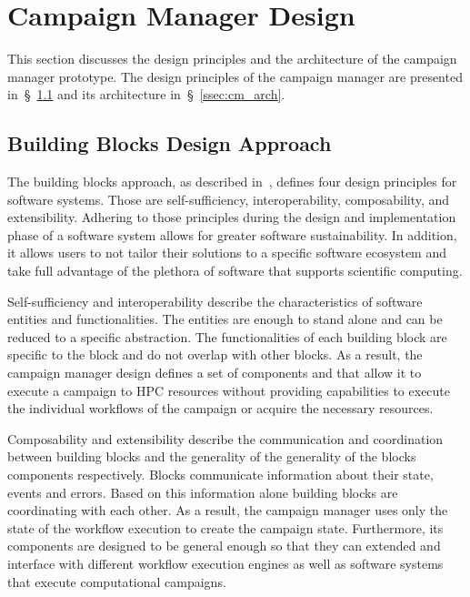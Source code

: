 \section{Campaign Manager Design}
\label{sec:cm_des}

This section discusses the design principles and the architecture of the 
campaign manager prototype. The design principles of the campaign manager are 
presented in~\S~\ref{ssec:building_blocks} and its architecture 
in~\S~\ref{ssec:cm_arch}.

\subsection{Building Blocks Design Approach}
\label{ssec:building_blocks}
The building blocks approach, as described in~\cite{turilli2019middleware}, 
defines four design principles for software systems. Those are 
self-sufficiency, interoperability, composability, and extensibility. Adhering 
to those principles during the design and implementation phase of a software 
system allows for greater software sustainability. In addition, it allows 
users to not tailor their solutions to a specific software ecosystem and take 
full advantage of the plethora of software that supports scientific computing.

Self-sufficiency and interoperability describe the characteristics of software 
entities and functionalities. The entities are enough to stand alone and can 
be reduced to a specific abstraction. The functionalities of each building 
block are specific to the block and do not overlap with other blocks. As a 
result, the campaign manager design defines a set of components and that allow 
it to execute a campaign to HPC resources without providing capabilities to 
execute the individual workflows of the campaign or acquire the necessary 
resources.

Composability and extensibility describe the communication and coordination 
between building blocks and the generality of the generality of the blocks 
components respectively. Blocks communicate information about their state, 
events and errors. Based on this information alone building blocks are 
coordinating with each other. As a result, the campaign manager uses only the 
state of the workflow execution to create the campaign state. Furthermore, its 
components are designed to be general enough so that they can extended and 
interface with different workflow execution engines as well as software 
systems that execute computational campaigns.

